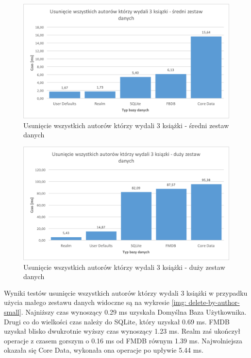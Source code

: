\begin{figure}[H]
    \centering\includegraphics[width=\linewidth]{img/delete_data/delete_by_author/delete_by_author_medium_test.png}
    \caption{Usunięcie wszystkich autorów którzy wydali 3 książki - średni zestaw danych}
    \label{img: delete-by-author-medium}
\end{figure}

\begin{figure}[H]
    \centering\includegraphics[width=\linewidth]{img/delete_data/delete_by_author/delete_by_author_big_test.png}
    \caption{Usunięcie wszystkich autorów którzy wydali 3 książki - duży zestaw danych}
    \label{img: delete-by-author-big}
\end{figure}

Wyniki testów usunięcie wszystkich autorów którzy wydali 3 książki w przypadku użycia małego zestawu danych widoczne są na wykresie \ref{img: delete-by-author-small}.  Najniższy czas wynoszący 0.29 ms uzyskała Domyślna Baza Użytkownika. Drugi co do wielkości czas należy do SQLite, który uzyskał 0.69 ms. FMDB uzyskał blisko dwukrotnie wyższy czas wynoszący 1.23 ms. Realm zaś ukończył operacje z czasem gorszym o 0.16 ms od FMDB równym 1.39 ms. Najwolniejsza okazała się Core Data, wykonała ona operacje po upływie 5.44 ms. 

